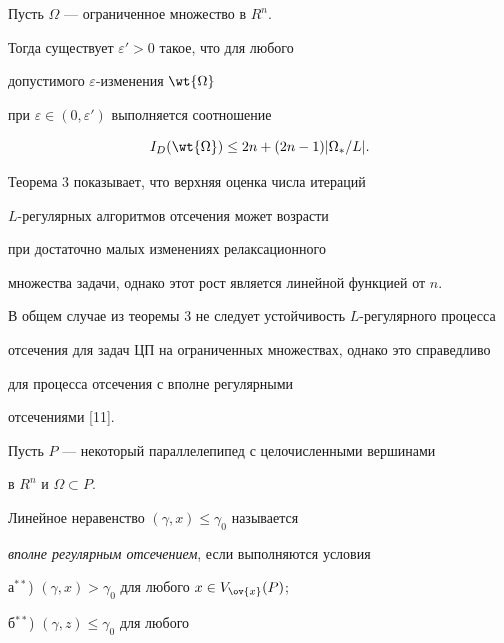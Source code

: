 \begin{thm}


Пусть $ \Omega$ ---  ограниченное множество в $R^{n}$.


Тогда существует $ \varepsilon' > 0$ такое, что для любого


допустимого $ \varepsilon$-изменения $ \wt{ \Omega}$


при $ \varepsilon \in


(0, \varepsilon')$ выполняется соотношение


$$


I_{D}( \wt{ \Omega}) \leq 2n + (2n-1) | \Omega_{*}/L |.


$$  


\end{thm}





Теорема 3 показывает, что верхняя оценка числа итераций


$L$-регулярных алгоритмов отсечения может возрасти 


при достаточно малых изменениях релаксационного


множества задачи, однако этот рост является линейной функцией от $n$.





В общем случае из теоремы 3 не следует устойчивость $L$-регулярного процесса


отсечения для задач ЦП на ограниченных множествах, однако  это справедливо


для процесса отсечения с вполне регулярными


отсечениями [11].








Пусть $P$ --- некоторый параллелепипед с целочисленными вершинами 


в $R^{n}$ и $ \Omega \subset P$.


Линейное неравенство $( \gamma,x) \leq \gamma_{0}$ называется


{ \it вполне регулярным отсечением}, если выполняются условия





а$^{**}$) $( \gamma,x) > \gamma_{0}$ для любого $x \in V_{ \ov{x}}(P)$;





б$^{**}$) $( \gamma,z) \leq \gamma_{0}$ для любого



